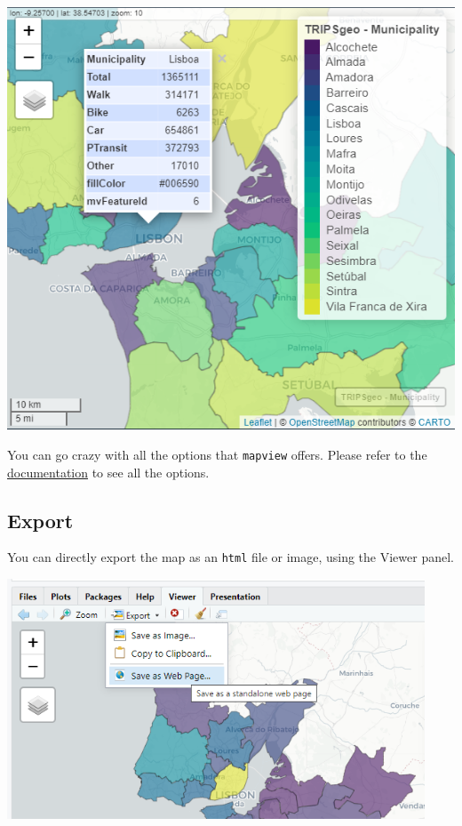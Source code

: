\documentclass[
  letterpaper,
  DIV=11,
  numbers=noendperiod]{scrreprt}
\begin{document}
\includegraphics[width=5.625in,height=\textheight]{images/clipboard-3307189144.png}

You can go crazy with all the options that \texttt{mapview} offers.
Please refer to the
\href{https://r-spatial.github.io/mapview/articles/mapview_02-advanced.html}{documentation}
to see all the options.

\subsection{Export}\label{export}

You can directly export the map as an \texttt{html} file or image, using
the Viewer panel.

\includegraphics[width=4.89583in,height=\textheight]{images/clipboard-3542861620.png}
\end{document}
